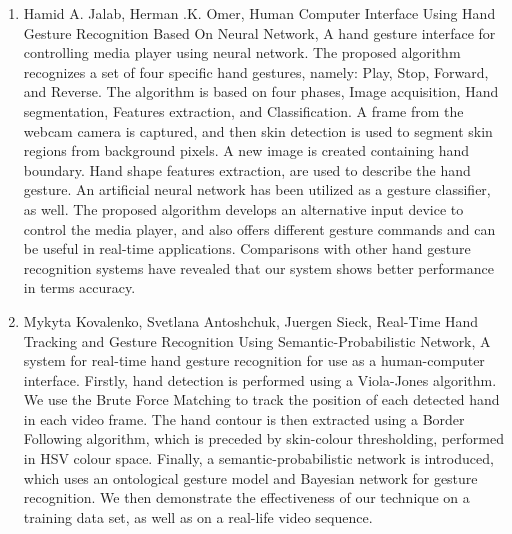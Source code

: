 \documentclass[11pt]{report}
\begin{document}
\begin{enumerate}
    \item Hamid A. Jalab, Herman .K. Omer, Human Computer Interface Using Hand Gesture Recognition Based On Neural Network, A hand gesture interface for controlling media player using neural network. The proposed algorithm recognizes a set of four specific hand gestures, namely: Play, Stop, Forward, and Reverse. The algorithm is based on four phases, Image acquisition, Hand segmentation, Features extraction, and Classification. A frame from the webcam camera is captured, and then skin detection is used to segment skin regions from background pixels. A new image is created containing hand boundary. Hand shape features extraction, are used to describe the hand gesture. An artificial neural network has been utilized as a gesture classifier, as well. The proposed algorithm develops an alternative input device to control the media player, and also offers different gesture commands and can be useful in real-time applications. Comparisons with other hand gesture recognition systems have revealed that our system shows better performance in terms accuracy.
    
    \item Mykyta Kovalenko, Svetlana Antoshchuk, Juergen Sieck, Real-Time Hand Tracking and Gesture Recognition Using Semantic-Probabilistic Network, A system for real-time hand gesture  recognition  for use  as  a  human-computer  interface.  Firstly,   hand   detection   is   performed   using   a   Viola-Jones   algorithm.  We  use  the  Brute Force Matching  to  track  the  position  of  each  detected  hand  in  each  video  frame.  The  hand  contour  is  then  extracted  using  a  Border  Following  algorithm,  which  is  preceded  by  skin-colour   thresholding, performed   in   HSV   colour   space.   Finally,  a  semantic-probabilistic  network  is  introduced,  which  uses  an  ontological  gesture  model  and  Bayesian  network  for  gesture  recognition.  We  then  demonstrate  the  effectiveness  of  our  technique  on  a  training  data  set,  as  well  as  on a  real-life video sequence.
    

\end{enumerate}
\end{document}
